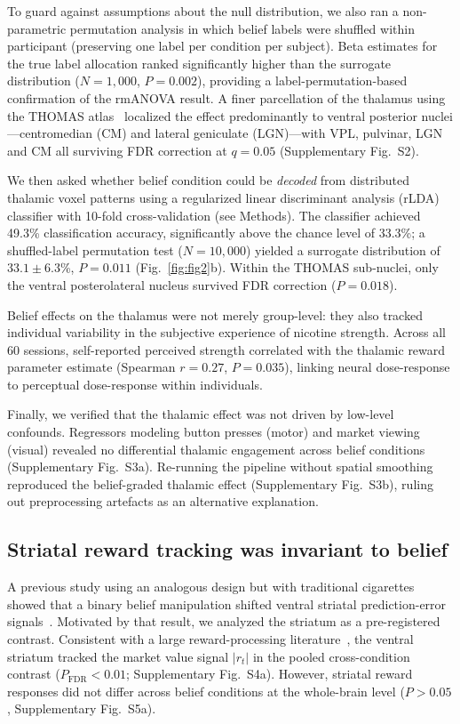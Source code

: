 \documentclass[11pt]{article}
\begin{document}
To guard against assumptions about the null distribution, we also ran a non-parametric permutation analysis in which belief labels were shuffled within participant (preserving one label per condition per subject). Beta estimates for the true label allocation ranked significantly higher than the surrogate distribution ($N=1{,}000$, $P=0.002$), providing a label-permutation-based confirmation of the rmANOVA result. A finer parcellation of the thalamus using the THOMAS atlas~\cite{mcleod2017spatially} localized the effect predominantly to ventral posterior nuclei---centromedian (CM) and lateral geniculate (LGN)---with VPL, pulvinar, LGN and CM all surviving FDR correction at $q=0.05$ (Supplementary Fig.~S2).

We then asked whether belief condition could be \textit{decoded} from distributed thalamic voxel patterns using a regularized linear discriminant analysis (rLDA) classifier with 10-fold cross-validation (see Methods). The classifier achieved 49.3\% classification accuracy, significantly above the chance level of 33.3\%; a shuffled-label permutation test ($N=10{,}000$) yielded a surrogate distribution of $33.1 \pm 6.3$\%, $P=0.011$ (Fig.~\ref{fig:fig2}b). Within the THOMAS sub-nuclei, only the ventral posterolateral nucleus survived FDR correction ($P=0.018$).

Belief effects on the thalamus were not merely group-level: they also tracked individual variability in the subjective experience of nicotine strength. Across all 60 sessions, self-reported perceived strength correlated with the thalamic reward parameter estimate (Spearman $r=0.27$, $P=0.035$), linking neural dose-response to perceptual dose-response within individuals.

Finally, we verified that the thalamic effect was not driven by low-level confounds. Regressors modeling button presses (motor) and market viewing (visual) revealed no differential thalamic engagement across belief conditions (Supplementary Fig.~S3a). Re-running the pipeline without spatial smoothing reproduced the belief-graded thalamic effect (Supplementary Fig.~S3b), ruling out preprocessing artefacts as an alternative explanation.

\subsection{Striatal reward tracking was invariant to belief}

A previous study using an analogous design but with traditional cigarettes showed that a binary belief manipulation shifted ventral striatal prediction-error signals~\cite{gu2015belief}. Motivated by that result, we analyzed the striatum as a pre-registered contrast. Consistent with a large reward-processing literature~\cite{haber2010reward,schultz1997neural}, the ventral striatum tracked the market value signal $|r_t|$ in the pooled cross-condition contrast ($P_\text{FDR} < 0.01$; Supplementary Fig.~S4a). However, striatal reward responses did not differ across belief conditions at the whole-brain level ($P>0.05$, Supplementary Fig.~S5a).
\end{document}
